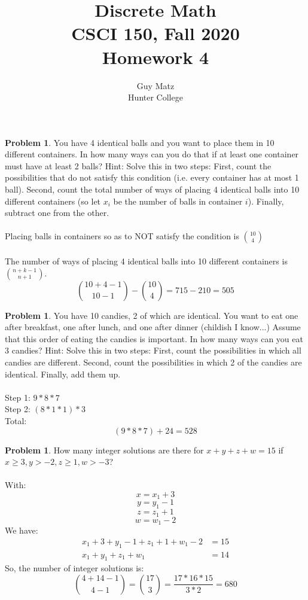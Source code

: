 \documentclass[10pt,leqno ]{article}
\title{Discrete Math\\
CSCI 150, Fall 2020\\
Homework 4}
\author{Guy Matz \\
Hunter College}
\theoremstyle{definition}
\newtheorem{problem}[theorem]{Problem}
\begin{document}
\begin{problem} You  have  4  identical  balls  and  you  want  to  place  them  in  10  different containers.  In how many ways can you do that if at least one container must  have  at  least  2  balls?  Hint:  Solve  this  in  two  steps:  First,  count the  possibilities  that  do  not  satisfy  this  condition  (i.e.   every  container has at most 1 ball).  Second, count the total number of ways of placing 4 identical balls into 10 different containers (so let $x_i$ be the number of balls in container $i$).  Finally, subtract one from the other.
\\\\
\Large
Placing balls in containers so as to NOT satisfy the condition is ${10 \choose 4}$\\\\
The number of ways of placing 4 identical balls into 10 different containers is ${n+k-1 \choose n+1}$. 
$$ {10 + 4 -1 \choose 10 - 1} - {10 \choose 4} = 715 - 210 = 505$$
\end{problem}
\newpage

\begin{problem} You have 10 candies, 2 of which are identical.  You want to eat one after breakfast, one after lunch, and one after dinner (childish I know...)  Assume that this order of eating the candies is important.  In how many ways can you eat 3 candies?  Hint:  Solve this in two steps:  First, count the possibilities in which all candies are different.  Second, count the possibilities in which 2 of the candies are identical.  Finally, add them up.
\\\\
\Large
Step 1: $9 * 8 * 7$\\
Step 2: $(8 * 1 * 1) * 3$\\
Total: $$ (9 * 8 * 7) + 24 = 528$$
\end{problem}
\newpage

\begin{problem} How many integer solutions are there for $x+y+z+w= 15$ if $x \geq 3, y >-2, z \geq 1, w > -3$?
\\
\Large
\\
With:
$$x = x_1 + 3$$
$$y = y_1 - 1$$
$$z = z_1 + 1$$
$$w = w_1  -2$$
We have:
\begin{align*}
x_1 + 3 + y_1 -1 + z_1 + 1 + w_1 -2 &= 15\\
x_1 + y_1 + z_1 + w_1 &= 14
\end{align*}
So, the number of integer solutions is:
$${{4 + 14 -1 \choose  {4-1}}} = {17 \choose 3} = \dfrac{17 * 16 * 15}{3*2} = 680$$
\end{problem}
\newpage
\end{document}
